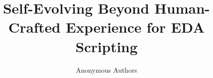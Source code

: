 \documentclass[conference]{IEEEtran}
\begin{document}
\title{Self-Evolving Beyond Human-Crafted Experience for EDA Scripting}

\author{Anonymous Authors}


\maketitle









\clearpage
\balance


\end{document}
